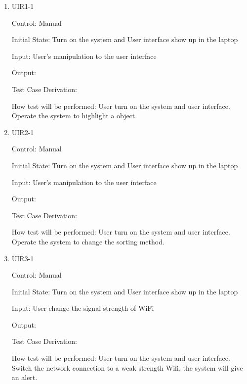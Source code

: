 \documentclass[12pt, titlepage]{article}
\begin{document}
\begin{enumerate}

\item{UIR1-1\\}

Control: Manual
					
Initial State: Turn on the system and User interface show up in the laptop
					
Input: User's manipulation to the user interface
					
Output: 

Test Case Derivation: 
					
How test will be performed: 
	User turn on the system and user interface. Operate the system to highlight a object.		
	
	
\item{UIR2-1\\}

Control: Manual
					
Initial State: Turn on the system and User interface show up in the laptop
					
Input: User's manipulation to the user interface
					
Output: 

Test Case Derivation: 
					
How test will be performed: 
	User turn on the system and user interface. Operate the system to change the sorting method.


\item{UIR3-1\\}

Control: Manual
					
Initial State: Turn on the system and User interface show up in the laptop
					
Input: User change the signal strength of WiFi
					
Output: 

Test Case Derivation: 
					
How test will be performed: 
	User turn on the system and user interface. Switch the network connection to a weak strength Wifi, the system will give an alert.
	

\end{enumerate}
\end{document}
